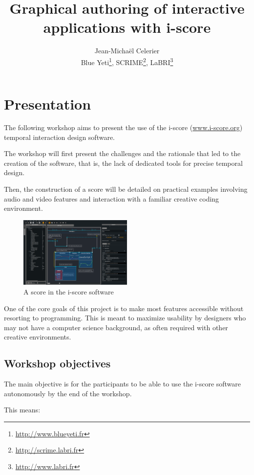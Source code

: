 \documentclass[11pt]{article}
\title{Graphical authoring of interactive applications with i-score}
\author{Jean-Michaël Celerier\\ \small Blue Yeti\thanks{\url{http://www.blueyeti.fr}}, SCRIME\thanks{\url{http://scrime.labri.fr}}, LaBRI\thanks{\url{http://www.labri.fr}}}
\date{}
\begin{document}
\maketitle
\vspace{-3cm}	
\section*{Presentation}
The following workshop aims to present the use of the i-score (\url{www.i-score.org}) temporal interaction design software.

The workshop will first present the challenges and the rationale that led to the creation of the software, that is, the lack of dedicated tools for precise temporal design.

Then, the construction of a score will be detailed on practical examples involving audio and video features and interaction with a familiar creative coding environment.

\begin{figure}[h]
	\centering
	\includegraphics[width=0.5\textwidth]{images/iscore.png}
	\caption*{A score in the i-score software}
\end{figure}One of the core goals of this project is to make most features accessible without resorting to programming. This is meant to maximize usability by designers who may not have a computer science background, as often required with other creative environments.

\subsection*{Workshop objectives}
The main objective is for the participants to be able to use the i-score software autonomously by the end of the workshop.

This means:
\end{document}

